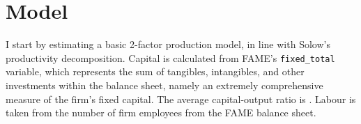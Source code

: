 \newpage
\section{Model}
I start by estimating a basic 2-factor production model, in line with Solow's productivity decomposition.
Capital is calculated from FAME's \texttt{fixed\_total} variable, which represents the sum of tangibles, intangibles, and other investments
within the balance sheet, namely an extremely comprehensive measure of the firm's fixed capital.
The average capital-output ratio is .
Labour is taken from the number of firm employees from the FAME balance sheet.